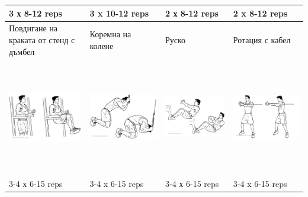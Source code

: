\documentclass{article}
\begin{document}
\begin{tabular}{ | m{4cm} | m{4cm} | m{4cm} |  m{4cm} | }
3 х 8-12 reps & 3 x 10-12 reps & 2 х 8-12 reps & 2 x 8-12 reps \\ 
\hline
Повдигане на краката от стенд с дъмбел&  Коремна на колене & Руско & Ротация с кабел \\ 
\begin{minipage}{4cm} \includegraphics[width=\linewidth, height=50mm]{Knee_Hip_Raise.png} \end{minipage} & 
\begin{minipage}{4cm} \includegraphics[width=\linewidth, height=50mm]{Kneeling_Cable_Crunch.png} \end{minipage} &
\begin{minipage}{4cm} \includegraphics[width=\linewidth, height=50mm]{Russian_Twist.png} \end{minipage} & 
\begin{minipage}{4cm} \includegraphics[width=\linewidth, height=50mm]{Cable_Core_Rotation.png} \end{minipage} \\
3-4 х 6-15 reps & 3-4 x 6-15 reps & 3-4 х 6-15 reps & 3-4 x 6-15 reps \\ 
\hline
\end{tabular}
\end{document}
